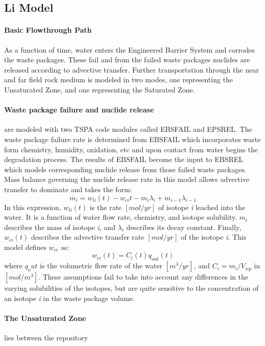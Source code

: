 \subsection{Li Model\cite{li_methodology_2006}}
\paragraph{Basic Flowthrough Path}
As a function of time, water enters the Engineered Barrier System and corrodes the waste packages. 
These fail and from the failed waste packages nuclides are released according to advective transfer. 
Further transportation through the near and far field rock medium is modeled in two modes, one 
representing the Unsaturated Zone, and one representing the Saturated Zone.
\paragraph{Waste package failure and nuclide release} are modeled with two TSPA code modules called 
EBSFAIL and EPSREL. The waste package failure rate is determined from EBSFAIL which incorporates 
waste form chemistry, humidity, oxidation, etc and upon contact from water begins the degradation 
process. The results of EBSFAIL become the input to EBSREL which models corresponding nuclide 
release from those failed waste packages. Mass balance governing the nuclide release rate in this 
model allows advective transfer to dominate and takes the form:
\begin{equation}
\dot{m_i}=w_{li}(t)-w_{ci}{t}-m_i\lambda_i+m_{i-1}\lambda_{i-1}\nonumber
\end{equation}
In this expression, $w_{li}(t)$ is the rate $[mol/yr]$ of isotope \emph{i} leached into the water. 
It is a function of water flow rate, chemistry, and isotope solubility. $m_i$ describes the mass of 
isotope \emph{i}, and $\lambda_i$ describes its decay constant. Finally, $w_{ci}(t)$ describes the 
advective transfer rate $[mol/yr]$ of the isotope \emph{i}. This model defines $w_{ci}$ as:
\begin{equation}
w_{ci}(t)=C_i(t)q_{out}(t)
\end{equation} where $q_out$ is the volumetric flow rate of the water $[m^3/yr]$, and $C_i = 
m_i/V_{wp}$ in $[mol/m^3]$. These assumptions fail to take into account any differences in the 
varying solubilities of the isotopes, but are quite sensitive to the concentration of an isotope 
\emph{i} in the waste package volume.  \paragraph{The Unsaturated Zone} lies between the repository 
